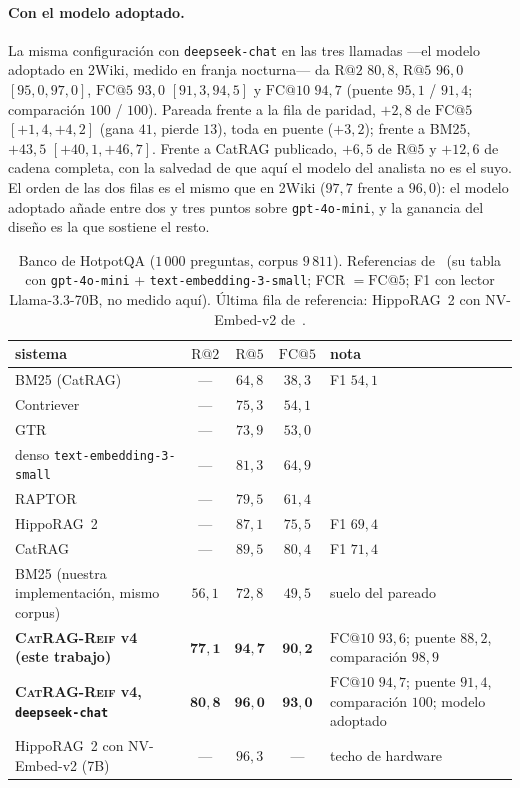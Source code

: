 \documentclass[11pt,a4paper]{article}
\newcommand{\sys}{\textsc{CatRAG-Reif}}
\newcommand{\hippo}{HippoRAG~2}
\begin{document}
\paragraph{Con el modelo adoptado.}
La misma configuración con \texttt{deepseek-chat} en las tres llamadas
---el modelo adoptado en 2Wiki, medido en franja nocturna--- da
$\mathrm{R@}2$ $80{,}8$, $\mathrm{R@}5$ $96{,}0$ $[95{,}0,97{,}0]$,
$\mathrm{FC@}5$ $93{,}0$ $[91{,}3,94{,}5]$ y $\mathrm{FC@}10$ $94{,}7$
(puente $95{,}1$ / $91{,}4$; comparación $100$ / $100$). Pareada frente a la
fila de paridad, $+2{,}8$ de $\mathrm{FC@}5$ $[+1{,}4,+4{,}2]$ (gana $41$,
pierde $13$), toda en puente ($+3{,}2$); frente a BM25, $+43{,}5$
$[+40{,}1,+46{,}7]$. Frente a CatRAG publicado, $+6{,}5$ de $\mathrm{R@}5$ y
$+12{,}6$ de cadena completa, con la salvedad de que aquí el modelo del
analista no es el suyo. El orden de las dos filas es el mismo que en 2Wiki
($97{,}7$ frente a $96{,}0$): el modelo adoptado añade entre dos y tres
puntos sobre \texttt{gpt-4o-mini}, y la ganancia del diseño es la que
sostiene el resto.

\begin{table}[t]
\centering\footnotesize\setlength{\tabcolsep}{5pt}
\caption{Banco de HotpotQA ($1\,000$ preguntas, corpus $9\,811$). Referencias
de~\cite{catrag} (su tabla con \texttt{gpt-4o-mini} +
\texttt{text-embedding-3-small}; FCR $=\mathrm{FC@}5$; F1 con lector
Llama-3.3-70B, no medido aquí). Última fila de referencia: \hippo{} con
NV-Embed-v2 de~\cite{hipporag2}.}
\label{tab:banco}
\begin{tabular}{lcccl}
\toprule
sistema & $\mathrm{R@}2$ & $\mathrm{R@}5$ & $\mathrm{FC@}5$ & nota\\
\midrule
BM25 (CatRAG) & --- & $64{,}8$ & $38{,}3$ & F1 $54{,}1$\\
Contriever~\cite{contriever} & --- & $75{,}3$ & $54{,}1$ & \\
GTR~\cite{gtr} & --- & $73{,}9$ & $53{,}0$ & \\
denso \texttt{text-embedding-3-small} & --- & $81{,}3$ & $64{,}9$ & \\
RAPTOR~\cite{raptor} & --- & $79{,}5$ & $61{,}4$ & \\
\hippo{}~\cite{hipporag2} & --- & $87{,}1$ & $75{,}5$ & F1 $69{,}4$\\
CatRAG~\cite{catrag} & --- & $89{,}5$ & $80{,}4$ & F1 $71{,}4$\\
\midrule
BM25 (nuestra implementación, mismo corpus) & $56{,}1$ & $72{,}8$ & $49{,}5$ & suelo del pareado\\
\textbf{\sys{} v4 (este trabajo)} & $\mathbf{77{,}1}$ & $\mathbf{94{,}7}$ & $\mathbf{90{,}2}$ & $\mathrm{FC@}10$ $93{,}6$; puente $88{,}2$, comparación $98{,}9$\\
\textbf{\sys{} v4, \texttt{deepseek-chat}} & $\mathbf{80{,}8}$ & $\mathbf{96{,}0}$ & $\mathbf{93{,}0}$ & $\mathrm{FC@}10$ $94{,}7$; puente $91{,}4$, comparación $100$; modelo adoptado\\
\midrule
\hippo{} con NV-Embed-v2 (7B) & --- & $96{,}3$ & --- & techo de hardware\\
\bottomrule
\end{tabular}
\end{table}
\end{document}
